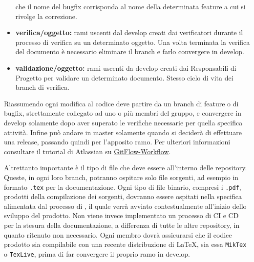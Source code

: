 \begin{itemize}
                                       che il nome del bugfix corrisponda al nome della determinata feature a cui si rivolge la correzione.
    \item \textbf{verifica/oggetto:} rami uscenti dal develop creati dai verificatori durante il processo di verifica su un determinato oggetto. Una volta terminata la verifica del documento
                                     è necessario eliminare il branch e farlo convergere in develop.
    \item \textbf{validazione/oggetto:} rami uscenti da develop creati dai Responsabili di Progetto per validare un determinato documento.
                                        Stesso ciclo di vita dei branch di verifica.
\end{itemize}
Riassumendo ogni modifica al codice deve partire da un branch di feature o di bugfix, strettamente collegato ad uno o più membri del gruppo, e convergere in develop solamente dopo
aver superato le verifiche necessarie per quella specifica attività.
Infine può andare in master solamente quando si deciderà di effettuare una release, passando quindi per l'apposito ramo.
Per ulteriori informazioni consultare il tutorial di Atlassian su \href{https://www.atlassian.com/git/tutorials/comparing-workflows/gitflow-workflow}{GitFlow-Workflow}.

Altrettanto importante è il tipo di file che deve essere all'interno delle repository. Queste, in ogni loro branch, potranno ospitare solo file sorgenti, ad esempio
in formato \verb|.tex| per la documentazione. Ogni tipo di file binario, compresi i \verb|.pdf|, prodotti della compilazione dei sorgenti, dovranno essere
ospitati nella specifica \textit{} alimentata dal processo di \textit{}, il quale verrà avviato contestualmente
all'inizio dello sviluppo del prodotto. Non viene invece implementato un processo di CI e CD per la stesura della documentazione, a differenza di tutte le altre repository,
in quanto ritenuto non necessario. Ogni membro dovrà assicurarsi che il codice prodotto sia compilabile con una recente distribuzione di \LaTeX,
sia essa \verb|MikTex| o \verb|TexLive|, prima di far convergere il proprio ramo in develop.
